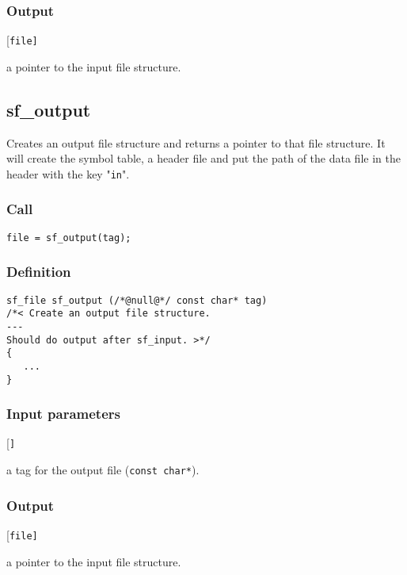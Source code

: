 \subsubsection*{Output}
\begin{desclist}{\tt }{\quad}[\tt file]
   \setlength\itemsep{0pt}
   \item[file] a pointer to the input file structure.
\end{desclist}




\subsection{{sf\_output}}\label{sec:sf_output}
Creates an output file structure and returns a pointer to that file structure. It will create the symbol table, a header file and put the path of the data file in the header with the key "\texttt{in}". 

\subsubsection*{Call}
\begin{verbatim}file = sf_output(tag);\end{verbatim}

\subsubsection*{Definition}
\begin{verbatim}
sf_file sf_output (/*@null@*/ const char* tag)
/*< Create an output file structure.
---
Should do output after sf_input. >*/
{
   ...
}
\end{verbatim}

\subsubsection*{Input parameters}
\begin{desclist}{\tt }{\quad}[\tt ]
   \setlength\itemsep{0pt}
   \item[tag] a tag for the output file (\texttt{const char*}).  
\end{desclist}

\subsubsection*{Output}
\begin{desclist}{\tt }{\quad}[\tt file]
   \setlength\itemsep{0pt}
   \item[file] a pointer to the input file structure.
\end{desclist}




